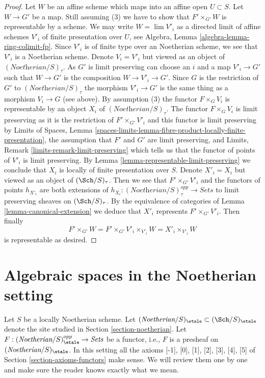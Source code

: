 \begin{proof}
\medskip\noindent
Let $W$ be an affine scheme which maps into an affine open $U \subset S$.
Let $W \to G'$ be a map.
Still assuming (3) we have to show that $F' \times_{G'} W$
is representable by a scheme.
We may write $W = \lim V'_i$ as a directed limit of affine
schemes $V'_i$ of finite presentation over $U$, see
Algebra, Lemma \ref{algebra-lemma-ring-colimit-fp}.
Since $V'_i$ is of finite type over an Noetherian scheme,
we see that $V'_i$ is a Noetherian scheme.
Denote $V_i = V'_i$ but viewed as an object of
$(\textit{Noetherian}/S)_\tau$. As $G'$
is limit preserving can choose an $i$ and a map
$V'_i \to G'$ such that $W \to G'$ is the composition
$W \to V'_i \to G'$. Since $G$ is the restriction of $G'$
to $(\textit{Noetherian}/S)_\tau$ the morphism $V'_i \to G'$
is the same thing as a morphism $V_i \to G$ (see above).
By assumption (3) the functor $F \times_G V_i$ is representable by an object
$X_i$ of $(\textit{Noetherian}/S)_\tau$.
The functor $F \times_G V_i$ is limit preserving
as it is the restriction of $F' \times_{G'} V'_i$
and this functor is limit preserving by
Limits of Spaces, Lemma
\ref{spaces-limits-lemma-fibre-product-locally-finite-presentation},
the assumption that $F'$ and $G'$ are limit preserving, and
Limits, Remark \ref{limits-remark-limit-preserving} which
tells us that the functor of points of $V'_i$ is limit preserving.
By Lemma \ref{lemma-representable-limit-preserving}
we conclude that $X_i$ is locally of finite presentation over $S$.
Denote $X'_i = X_i$ but viewed as an object of
$(\Sch/S)_\tau$. Then we see that $F' \times_{G'} V'_i$
and the functors of points $h_{X'_i}$ are both extensions
of $h_{X_i} : (\textit{Noetherian}/S)_\tau^{opp} \to \textit{Sets}$
to limit preserving sheaves on $(\Sch/S)_\tau$.
By the equivalence of categories of Lemma \ref{lemma-canonical-extension}
we deduce that $X'_i$ represents $F' \times_{G'} V'_i$.
Then finally
$$
F' \times_{G'} W = F' \times_{G'} V'_i \times_{V'_i} W =
X'_i \times_{V'_i} W
$$
is representable as desired.
\end{proof}






\section{Algebraic spaces in the Noetherian setting}
\label{section-algebraic-spaces-noetherian}

\noindent
Let $S$ be a locally Noetherian scheme. Let
$(\textit{Noetherian}/S)_\etale \subset (\Sch/S)_\etale$
denote the site studied in Section \ref{section-noetherian}.
Let $F : (\textit{Noetherian}/S)_\etale^{opp} \to \textit{Sets}$
be a functor, i.e., $F$ is a presheaf on $(\textit{Noetherian}/S)_\etale$.
In this setting all the axioms [-1],  [0], [1], [2], [3], [4], [5] of
Section \ref{section-axioms-functors} make sense. We will review them
one by one and make sure the reader knows exactly what we mean.

